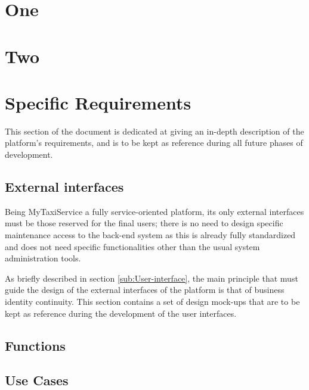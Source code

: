 \documentclass[english]{article}
\begin{document}
\section{One }


\section{Two}


\section{Specific Requirements}

This section of the document is dedicated at giving an in-depth description
of the platform's requirements, and is to be kept as reference during
all future phases of development. 


\subsection{External interfaces}

Being MyTaxiService a fully service-oriented platform, its only external
interfaces must be those reserved for the final users; there is no
need to design specific maintenance access to the back-end system
as this is already fully standardized and does not need specific functionalities
other than the usual system administration tools.

As briefly described in section \ref{sub:User-interface}, the main
principle that must guide the design of the external interfaces of
the platform is that of business identity continuity. This section
contains a set of design mock-ups that are to be kept as reference
during the development of the user interfaces. 


\subsection{Functions}


\subsection{Use Cases}
\end{document}
